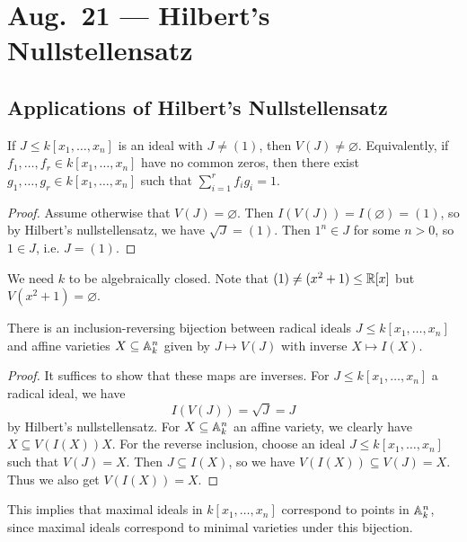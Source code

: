 \chapter{Aug.~21 --- Hilbert's Nullstellensatz}

\section{Applications of Hilbert's Nullstellensatz}

\begin{corollary}
  If $J \le k[x_1, \dots, x_n]$ is an
  ideal with $J \ne (1)$, then
  $V(J) \ne \varnothing$. Equivalently,
  if $f_1, \dots, f_r \in k[x_1, \dots, x_n]$
  have no common zeros, then there
  exist $g_1, \dots, g_r \in k[x_1, \dots, x_n]$
  such that $\sum_{i = 1}^r f_i g_i = 1$.
\end{corollary}

\begin{proof}
  Assume otherwise that $V(J) = \varnothing$.
  Then
  $I(V(J)) = I(\varnothing) = (1)$,
  so by Hilbert's nullstellensatz,
  we have $\sqrt{J} = (1)$. Then
  $1^n \in J$ for some $n > 0$, so
  $1 \in J$, i.e. $J = (1)$.
\end{proof}

\begin{remark}
  We need
  $k$ to be algebraically closed.
  Note that $(1) \ne (x^2 + 1) \le \mathbb{R}[x]$
  but $V(x^2 + 1) = \varnothing$.
\end{remark}

\begin{corollary}
  There is an inclusion-reversing bijection
  between radical ideals $J \le k[x_1, \dots, x_n]$ and
  affine varieties $X \subseteq \mathbb{A}_k^n$
  given by $J \mapsto V(J)$ with inverse $X \mapsto I(X)$.
\end{corollary}

\begin{proof}
  It suffices to show that these maps
  are inverses. For $J \le k[x_1, \dots, x_n]$
  a radical ideal, we have
  \[
    I(V(J)) = \sqrt{J} = J
  \]
  by Hilbert's nullstellensatz. For
  $X \subseteq \mathbb{A}_k^n$ an affine
  variety, we clearly have
  $X \subseteq V(I(X)) X$. For the
  reverse inclusion, choose
  an ideal $J \le k[x_1, \dots, x_n]$
  such that $V(J) = X$. Then
  $J \subseteq I(X)$, so we have
  $V(I(X)) \subseteq V(J) = X$.
  Thus we also get $V(I(X)) = X$.
\end{proof}

\begin{remark}
  This implies that maximal ideals in
  $k[x_1, \dots, x_n]$ correspond to
  points in $\mathbb{A}_k^n$, since
  maximal ideals correspond to minimal
  varieties under this bijection.
\end{remark}

